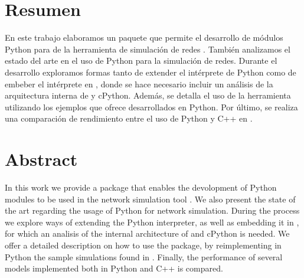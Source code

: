 \chapter*{Resumen}
En este trabajo elaboramos un paquete que permite el desarrollo de módulos
Python para de la herramienta de simulación de redes \omnetpp{}. También
analizamos el estado del arte en el uso de Python para la simulación de redes.
Durante el desarrollo exploramos formas tanto de extender el intérprete de
Python como de embeber el intérprete en \omnetpp{}, donde se hace necesario
incluir un análisis de la arquitectura interna de \omnetpp{} y cPython. Además,
se detalla el uso de la herramienta utilizando los ejemplos que ofrece
\omnetpp{} desarrollados en Python. Por último, se realiza una comparación de
rendimiento entre el uso de Python y C++ en \omnetpp{}.

\chapter*{Abstract}
In this work we provide a package that enables the devolopment of Python
modules to be used in the network simulation tool \omnetpp{}. We also present
the state of the art regarding the usage of Python for network simulation.
During the process we explore ways of extending the Python interpreter, as well
as embedding it in \omnetpp{}, for which an analisis of the internal
architecture of \omnetpp{} and cPython is needed.  We offer a detailed
description on how to use the package, by reimplementing in Python the sample
simulations found in \omnetpp{}. Finally, the performance of several \omnetpp{}
models implemented both in Python and C++ is compared.

